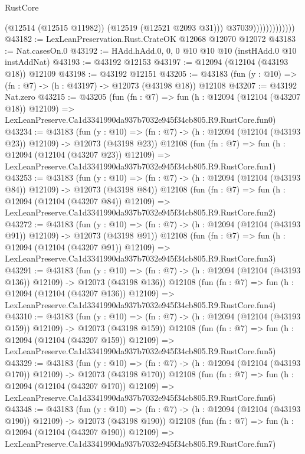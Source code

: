 \begin{lexlean}{RustCore}
\begin{coremodule}
                                (@12514 (@12515 @11982))
                                (@12519 (@12521 @2093 @31)))
                              @37039)))))))))))))
@43182 := LexLeanPreservation.Rust.CrateOK @12068 @12070 @12072
@43183 := Nat.casesOn.{0}
@43192 := HAdd.hAdd.{0, 0, 0} @10 @10 @10 (instHAdd.{0} @10 instAddNat)
@43193 := @43192 @12153
@43197 := @12094 (@12104 (@43193 @18)) @12109
@43198 := @43192 @12151
@43205 := @43183 (fun (y : @10) => (fn : @7) -> (h : @43197) -> @12073 (@43198 @18)) @12108
@43207 := @43192 Nat.zero
@43215 := @43205
    (fun (fn : @7) =>
    fun (h : @12094 (@12104 (@43207 @18)) @12109) =>
    LexLeanPreserve.Ca1d3341990da937b7032e945f34cb805.R9.RustCore.fun0)
@43234 := @43183
    (fun (y : @10) => (fn : @7) -> (h : @12094 (@12104 (@43193 @23)) @12109) -> @12073 (@43198 @23))
    @12108
    (fun (fn : @7) =>
    fun (h : @12094 (@12104 (@43207 @23)) @12109) =>
    LexLeanPreserve.Ca1d3341990da937b7032e945f34cb805.R9.RustCore.fun1)
@43253 := @43183
    (fun (y : @10) => (fn : @7) -> (h : @12094 (@12104 (@43193 @84)) @12109) -> @12073 (@43198 @84))
    @12108
    (fun (fn : @7) =>
    fun (h : @12094 (@12104 (@43207 @84)) @12109) =>
    LexLeanPreserve.Ca1d3341990da937b7032e945f34cb805.R9.RustCore.fun2)
@43272 := @43183
    (fun (y : @10) => (fn : @7) -> (h : @12094 (@12104 (@43193 @91)) @12109) -> @12073 (@43198 @91))
    @12108
    (fun (fn : @7) =>
    fun (h : @12094 (@12104 (@43207 @91)) @12109) =>
    LexLeanPreserve.Ca1d3341990da937b7032e945f34cb805.R9.RustCore.fun3)
@43291 := @43183
    (fun (y : @10) =>
    (fn : @7) -> (h : @12094 (@12104 (@43193 @136)) @12109) -> @12073 (@43198 @136))
    @12108
    (fun (fn : @7) =>
    fun (h : @12094 (@12104 (@43207 @136)) @12109) =>
    LexLeanPreserve.Ca1d3341990da937b7032e945f34cb805.R9.RustCore.fun4)
@43310 := @43183
    (fun (y : @10) =>
    (fn : @7) -> (h : @12094 (@12104 (@43193 @159)) @12109) -> @12073 (@43198 @159))
    @12108
    (fun (fn : @7) =>
    fun (h : @12094 (@12104 (@43207 @159)) @12109) =>
    LexLeanPreserve.Ca1d3341990da937b7032e945f34cb805.R9.RustCore.fun5)
@43329 := @43183
    (fun (y : @10) =>
    (fn : @7) -> (h : @12094 (@12104 (@43193 @170)) @12109) -> @12073 (@43198 @170))
    @12108
    (fun (fn : @7) =>
    fun (h : @12094 (@12104 (@43207 @170)) @12109) =>
    LexLeanPreserve.Ca1d3341990da937b7032e945f34cb805.R9.RustCore.fun6)
@43348 := @43183
    (fun (y : @10) =>
    (fn : @7) -> (h : @12094 (@12104 (@43193 @190)) @12109) -> @12073 (@43198 @190))
    @12108
    (fun (fn : @7) =>
    fun (h : @12094 (@12104 (@43207 @190)) @12109) =>
    LexLeanPreserve.Ca1d3341990da937b7032e945f34cb805.R9.RustCore.fun7)

\end{coremodule}
\end{lexlean}
